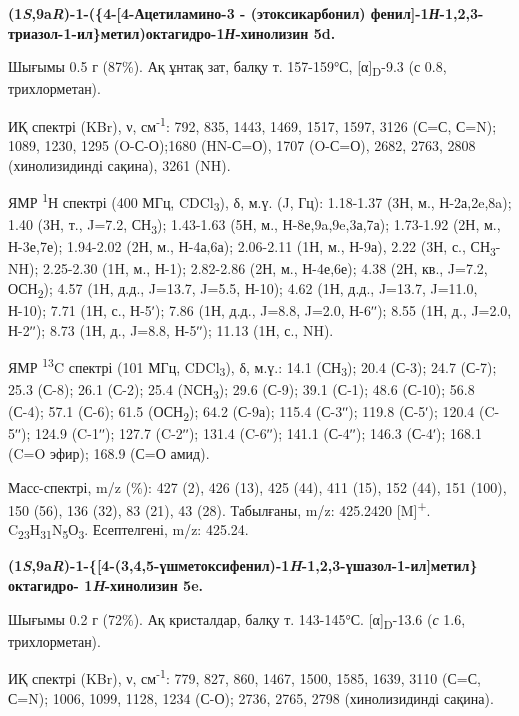 \begin{multicols}{2}
{\bfseries (1\emph{S},9a\emph{R})-1-(\{4-{[}4-Ацетиламино-3 - (этоксикарбонил) фенил{]}-1\emph{Н}-1,2,3-триазол-1-ил\}метил)октагидро-1\emph{Н}-хинолизин
5d.}

Шығымы 0.5 г (87\%). Ақ ұнтақ зат, балқу т. 157-159°С,
{[}α{]}\textsubscript{D}-9.3 (с 0.8, трихлорметан).

ИҚ спектрі (KBr), ν, см\textsuperscript{-1}: 792, 835, 1443, 1469, 1517,
1597, 3126 (С=С, С=N); 1089, 1230, 1295 (O-С-О);1680 (HN-С=О), 1707
(O-С=О), 2682, 2763, 2808 (хинолизидинді сақина), 3261 (NH).

ЯМР \textsuperscript{1}Н спектрі (400 МГц, CDCl\textsubscript{3}), δ,
м.ү. (J, Гц): 1.18-1.37 (3Н, м., Н-2а,2e,8a); 1.40 (3Н, т., J=7.2,
СН\textsubscript{3}); 1.43-1.63 (5Н, м., Н-8е,9a,9e,3а,7а); 1.73-1.92
(2Н, м., Н-3е,7е); 1.94-2.02 (2Н, м., Н-4а,6а); 2.06-2.11 (1Н, м.,
Н-9а), 2.22 (3Н, с., СН\textsubscript{3}-NH); 2.25-2.30 (1H, м., Н-1);
2.82-2.86 (2Н, м., Н-4е,6е); 4.38 (2Н, кв., J=7.2,
ОСН\textsubscript{2}); 4.57 (1Н, д.д., J=13.7, J=5.5, Н-10); 4.62 (1Н,
д.д., J=13.7, J=11.0, Н-10); 7.71 (1Н, с., Н-5ʹ); 7.86 (1Н, д.д., J=8.8,
J=2.0, Н-6ʹʹ); 8.55 (1Н, д., J=2.0, Н-2ʹʹ); 8.73 (1Н, д., J=8.8, Н-5ʹʹ);
11.13 (1Н, с., NH).

ЯМР \textsuperscript{13}C спектрі (101 МГц, CDCl\textsubscript{3}), δ,
м.ү.: 14.1 (СН\textsubscript{3}); 20.4 (С-3); 24.7 (С-7); 25.3 (С-8);
26.1 (С-2); 25.4 (NСН\textsubscript{3}); 29.6 (С-9); 39.1 (С-1); 48.6
(С-10); 56.8 (С-4); 57.1 (С-6); 61.5 (ОСН\textsubscript{2}); 64.2
(С-9а); 115.4 (С-3ʹʹ); 119.8 (С-5ʹ); 120.4 (C-5ʹʹ); 124.9 (C-1ʹʹ); 127.7
(C-2ʹʹ); 131.4 (C-6ʹʹ); 141.1 (С-4ʹʹ); 146.3 (С-4ʹ); 168.1 (C=O эфир);
168.9 (С=О амид).

Масс-спектрі, m/z (\%): 427 (2), 426 (13), 425 (44), 411 (15), 152 (44),
151 (100), 150 (56), 136 (32), 83 (21), 43 (28). Табылғаны, m/z:
425.2420 {[}M{]}\textsuperscript{+}.
C\textsubscript{23}H\textsubscript{31}N\textsubscript{5}О\textsubscript{3}.
Есептелгені, m/z: 425.24.

{\bfseries (1\emph{S},9a\emph{R})-1-\{{[}4-(3,4,5-үшметоксифенил)-1\emph{H}-1,2,3-үшазол-1-ил{]}метил\}октагидро-
1\emph{H}-хинолизин 5e.}

Шығымы 0.2 г (72\%). Ақ кристалдар, балқу т. 143-145°С.
{[}α{]}\textsubscript{D}-13.6 (\emph{с} 1.6, трихлорметан).

ИҚ спектрі (KBr), ν, см\textsuperscript{-1}: 779, 827, 860, 1467, 1500,
1585, 1639, 3110 (С=С, С=N); 1006, 1099, 1128, 1234 (С-О); 2736, 2765,
2798 (хинолизидинді сақина).


\end{multicols}
